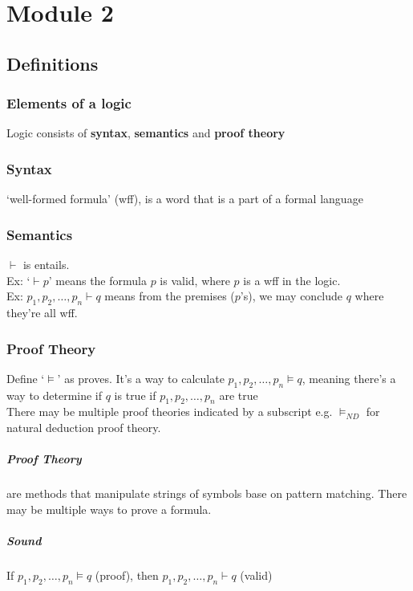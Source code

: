 \chapter{Module 2}
  \section{Definitions}
    \subsection{Elements of a logic}
      Logic consists of \textbf{syntax}, \textbf{semantics} and \textbf{proof
      theory}
    \subsection{Syntax}
      `well-formed formula' (wff), is a word that is a part of a formal
      language
    \subsection{Semantics}
      $\vdash$ is entails. \\
      Ex: `$\vdash p$' means the formula $p$ is valid, where $p$ is a wff in the
      logic.\\
      Ex: $p_1, p_2,\ldots,p_n \vdash q$ means from the premises ($p$'s), we
      may conclude $q$ where they're all wff.
    \subsection{Proof Theory}
      Define `$\models$' as proves. It's a way to calculate $p_1,
      p_2,\ldots,p_n \models q$, meaning there's a way to determine if $q$ is
      true if $p_1, p_2,\ldots,p_n$ are true\\
      There may be multiple proof theories indicated by a subscript e.g.
      $\models_{ND}$ for natural deduction proof theory.

      \paragraph{Proof Theory} are methods that manipulate strings of symbols
      base on pattern matching. There may be multiple ways to prove a formula.

      \paragraph{Sound} If $p_1, p_2,\ldots,p_n \models q$ (proof), then $p_1,
      p_2,\ldots,p_n \vdash q$ (valid)

